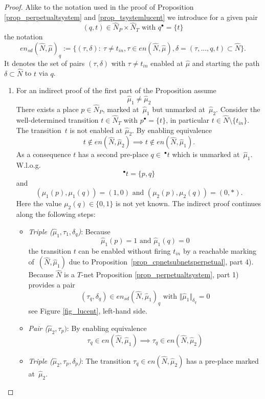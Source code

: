 \documentclass{fundam}
\begin{document}
\begin{proof}
Alike to the notation used in the proof of Proposition \ref{prop_perpetualtsystem} and \ref{prop_tsystemlucent} we introduce for a given pair
$$(q,t)\in \hat{N}_P\times{}\hat{N}_T \text{ with }  q ^\bullet=\{t\}$$
the notation
$$en_{sd}(\hat{N},\hat{\mu})_q:=\{(\tau,\delta):\ \tau \neq t_{in}, \tau \in en(\hat{N},\hat{\mu}), \delta=(\tau,...,q,t) \subset \hat{N}\}.$$
It denotes the set of pairs $(\tau,\delta)$ with $\tau\neq t_{in}$ enabled at $\hat{\mu}$ and starting the path $\delta \subset \hat{N}$ to $t$ via $q$.
\begin{enumerate}
\item For an indirect proof of the first part of the Proposition assume
$$\hat{\mu}_1 \neq \hat{\mu}_2$$
There exists a place $p \in \hat {N}_P$, marked \mbox{at $\hat{\mu}_1$} but unmarked \mbox{at $\hat{\mu}_2$}. Consider the well-determined transition $t \in \hat N_T$ with
$p^\bullet=\{t\}$, in particular $t\in \hat{N} \setminus \{t_{in}\}$. The \mbox{transition $t$} is not enabled at $\hat{\mu}_2$. By enabling equivalence
$$t \notin en(\hat{N},\hat{\mu}_2) \implies t \notin en(\hat{N},\hat{\mu}_1).$$
As a consequence $t$ has a second pre-place $q \in\ ^\bullet t$ which is unmarked \mbox{at $\hat{\mu}_1$}. W.l.o.g.
$$^\bullet t=\{p,q\}$$
and
$$(\mu_1(p),\mu_1(q))=(1,0) \text{ and } (\mu_2(p),\mu_2(q))=(0,*).$$
Here the value $\mu_2(q)\in \{0,1\}$ is not yet known. The indirect proof continues along the following steps:
\begin{itemize}
\item \emph{Triple ($\hat{\mu}_1, \tau_{1}, \delta_q$)}: Because
$$\hat{\mu}_1(p) =1 \text{ and } \hat{\mu}_1(q)=0$$
the transition $t$ can be enabled without firing $t_{in}$ by a reachable marking \mbox{of $(\hat{N},\hat{\mu}_1)$} due to \mbox{Proposition \ref{prop_cpnetsubnetsperpetual}}, part 4). Because $\hat{N}$ is a $T$-net Proposition \ref{prop_perpetualtsystem}, part 1) provides a pair
$$(\tau_q,\delta_q) \in en_{sd}(\hat{N},\hat{\mu}_1)_q \text{ with } \Vert \hat{\mu}_1 \Vert_{\delta_q}=0$$
see Figure \ref{fig_lucent}, left-hand side.

\item \emph{Pair ($\hat{\mu}_2,\tau_p)$}: By enabling equivalence
$$\tau_q \in en(\hat{N},\hat{\mu}_1) \implies \tau_q \in en(\hat{N},\hat{\mu}_2)$$

\item \emph{Triple ($\hat{\mu}_2,\tau_p,\delta_p$)}: The transition $\tau_q \in en(\hat{N},\hat{\mu}_2)$ has a pre-place marked \mbox{at $\hat{\mu}_2$}.


\end{itemize}
\end{enumerate}
\end{proof}
\end{document}
